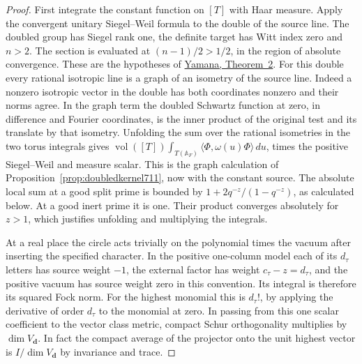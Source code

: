 \documentclass[a4paper,11pt]{article}
\theoremstyle{definition}
\theoremstyle{remark}
\numberwithin{equation}{section}
\begin{document}
\begin{proof}
First integrate the constant function on \([T]\) with Haar
measure. Apply the convergent unitary Siegel--Weil formula
to the double of the source line. The doubled group has
Siegel rank one, the definite target has Witt index zero and
\(n>2\). The section is evaluated at \((n-1)/2>1/2\), in the
region of absolute convergence. These are the hypotheses of
\href{https://msp.org/pjm/2013/264-1/pjm-v264-n1-p11-s.pdf}
{Yamana, Theorem~2}. For this double every rational isotropic
line is a graph of an isometry of the source line. Indeed a
nonzero isotropic vector in the double has both coordinates
nonzero and their norms agree. In the graph term the doubled
Schwartz function at zero, in difference and Fourier
coordinates, is the inner product of the original test and
its translate by that isometry. Unfolding the sum over the
rational isometries in the two torus integrals gives
\(\operatorname{vol}([T])\int_{T(\mathbb A_F)}
 \langle\Phi,\omega(u)\Phi\rangle\,du\), times the positive
Siegel--Weil and measure scalar. This is the graph calculation
of Proposition~\ref{prop:doubledkernel711}, now with the
constant source. The absolute local sum at a good split prime
is bounded by \(1+2q^{-z}/(1-q^{-z})\), as calculated below.
At a good inert prime it is one. Their product converges
absolutely for \(z>1\), which justifies unfolding and
multiplying the integrals.

At a real place the circle acts trivially on the polynomial
times the vacuum after inserting the specified character.
In the positive one-column model each of its \(d_\tau\)
letters has source weight \(-1\), the external factor has
weight \(c_\tau-z=d_\tau\), and the positive vacuum has source
weight zero in this convention. Its integral is therefore its
squared Fock norm. For the highest monomial this is \(d_\tau!\),
by applying the derivative of order \(d_\tau\) to the monomial
at zero. In passing from this one scalar coefficient to the
vector class metric, compact Schur orthogonality multiplies
by \(\dim V_{\mathbf d}\). In fact the compact average of the
projector onto the unit highest vector is
\(I/\dim V_{\mathbf d}\) by invariance and trace.


\end{proof}
\end{document}
